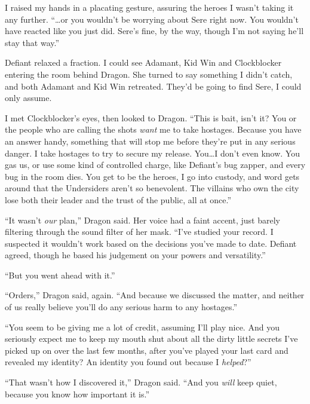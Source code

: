 I raised my hands in a placating gesture, assuring the heroes I wasn't taking it any further. ``\ldots{}or you wouldn't be worrying about Sere right now.  You wouldn't have reacted like you just did.  Sere's fine, by the way, though I'm not saying he'll stay that way.''



Defiant relaxed a fraction.  I could see Adamant, Kid Win and Clockblocker entering the room behind Dragon.  She turned to say something I didn't catch, and both Adamant and Kid Win retreated.  They'd be going to find Sere, I could only assume.



I met Clockblocker's eyes, then looked to Dragon.  ``This is bait, isn't it?  You or the people who are calling the shots \emph{want} me to take hostages.  Because you have an answer handy, something that will stop me before they're put in any serious danger.  I take hostages to try to secure my release.  You\ldots I don't even know.  You gas us, or use some kind of controlled charge, like Defiant's bug zapper, and every bug in the room dies.  You get to be the heroes, I go into custody, and word gets around that the Undersiders aren't so benevolent.  The villains who own the city lose both their leader and the trust of the public, all at once.''



``It wasn't \emph{our} plan,'' Dragon said.  Her voice had a faint accent, just barely filtering through the sound filter of her mask.  ``I've studied your record.  I suspected it wouldn't work based on the decisions you've made to date.  Defiant agreed, though he based his judgement on your powers and versatility.''



``But you went ahead with it.''



``Orders,'' Dragon said, again.  ``And because we discussed the matter, and neither of us really believe you'll do any serious harm to any hostages.''



``You seem to be giving me a lot of credit, assuming I'll play nice.  And you seriously expect me to keep my mouth shut about all the dirty little secrets I've picked up on over the last few months, after you've played your last card and revealed my identity?  An identity you found out because I \emph{helped}?''



``That wasn't how I discovered it,'' Dragon said.  ``And you \emph{will} keep quiet, because you know how important it is.''



